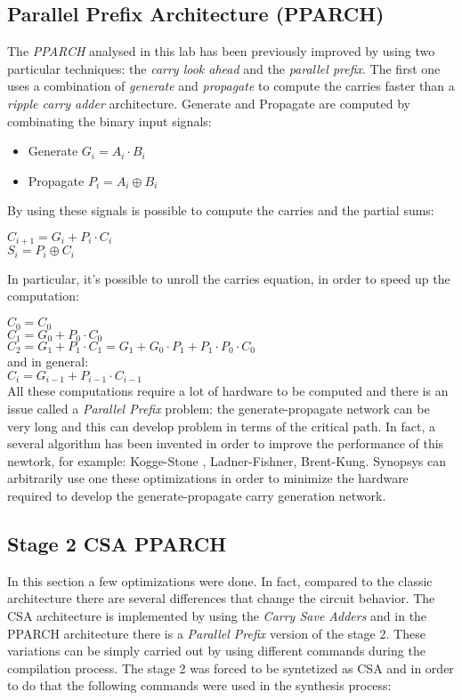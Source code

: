 \subsection{Parallel Prefix Architecture (PPARCH)}
The \textit{PPARCH} analysed in this lab has been previously improved by using two particular techniques: the \textit{carry look ahead} and the \textit{parallel prefix}. The first one uses a combination of \textit{generate} and \textit{propagate} to compute the carries faster than a \textit{ripple carry adder} architecture. Generate and Propagate are computed by combinating the binary input signals:
\begin{itemize} 
\item Generate $G_i = A_i \cdot B_i$
\item Propagate $P_i = A_i \oplus B_i$
\end{itemize}
By using these signals is possible to compute the carries and the partial sums:
\begin{center}
$C_{i+1} = G_i + P_i \cdot C_i$ \\
$S_i = P_i \oplus C_i $
\end{center}
In particular, it's possible to unroll the carries equation, in order to speed up the computation:

\noindent
$C_0 = C_0$ \\
$C_1 = G_0 + P_0 \cdot C_0$\\
$C_2 = G_1 + P_1 \cdot C_1 = G_1 + G_0 \cdot P_1  + P_1 \cdot P_0 \cdot C_0$\\
and in general: \\
$C_i = G_{i-1} + P_{i-1} \cdot C_{i-1}$\\
\noindent
All these computations require a lot of hardware to be computed and there is an issue called a \textit{Parallel Prefix} problem: the generate-propagate network can be very long and this can develop problem in terms of the critical path. In fact, a several algorithm has been invented in order to improve the performance of this newtork, for example: Kogge-Stone , Ladner-Fishner, Brent-Kung. Synopsys can arbitrarily use one these optimizations in order to minimize the hardware required to develop the generate-propagate carry generation network.
\subsection{Stage 2 CSA PPARCH}
In this section a few optimizations were done. In fact, compared to the classic architecture there are several differences that change the circuit behavior. The CSA architecture is implemented by using the \textit{Carry Save Adders} and in the PPARCH architecture there is a \textit{Parallel Prefix} version of the stage 2. These variations can be simply carried out by using different commands during the compilation process. The stage 2 was forced to be syntetized as CSA and in order to do that the following commands were used in the synthesis process:

